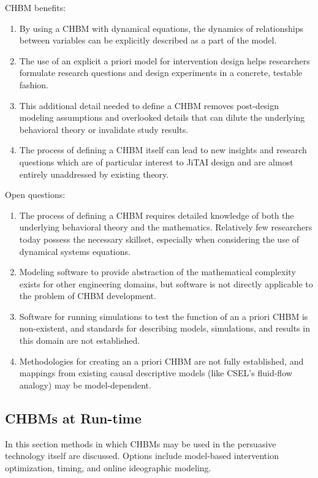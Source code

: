 \documentclass[runningheads,a4paper]{llncs}
\begin{document}
CHBM benefits: 
\begin{enumerate}
    \item By using a CHBM with dynamical equations, the dynamics of relationships between variables can be explicitly described as a part of the model.
    \item The use of an explicit a priori model for intervention design helps researchers formulate research questions and design experiments in a concrete, testable fashion.
    \item This additional detail needed to define a CHBM removes post-design modeling assumptions and overlooked details that can dilute the underlying behavioral theory or invalidate study results.
    \item The process of defining a CHBM itself can lead to new insights and research questions which are of particular interest to JiTAI design and are almost entirely unaddressed by existing theory.
\end{enumerate}

Open questions:
\begin{enumerate}
    \item The process of defining a CHBM requires detailed knowledge of both the underlying behavioral theory and the mathematics. Relatively few researchers today possess the necessary skillset, especially when considering the use of dynamical systems equations.
    \item Modeling software to provide abstraction of the mathematical complexity exists for other engineering domains, but software is not directly applicable to the problem of CHBM development. %
    \item Software for running simulations to test the function of an a priori CHBM is non-existent, and standards for describing models, simulations, and results in this domain are not established.
    \item Methodologies for creating an a priori CHBM are not fully established, and mappings from existing causal descriptive models (like CSEL's fluid-flow analogy) may be model-dependent.
\end{enumerate}

\subsection{CHBMs at Run-time}
In this section methods in which CHBMs may be used in the persuasive technology itself are discussed. 
Options include model-based intervention optimization, timing, and online ideographic modeling.
\end{document}
